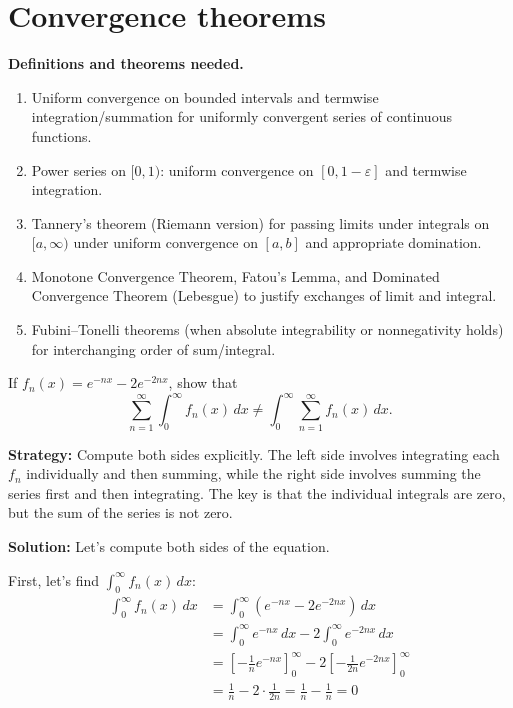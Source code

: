 \section{Convergence theorems}

\noindent\textbf{Definitions and theorems needed.}
\begin{enumerate}[label=(\alph*)]
\item Uniform convergence on bounded intervals and termwise integration/summation for uniformly convergent series of continuous functions.
\item Power series on $[0,1)$: uniform convergence on $[0,1-\varepsilon]$ and termwise integration.
\item Tannery's theorem (Riemann version) for passing limits under integrals on $[a,\infty)$ under uniform convergence on $[a,b]$ and appropriate domination.
\item Monotone Convergence Theorem, Fatou's Lemma, and Dominated Convergence Theorem (Lebesgue) to justify exchanges of limit and integral.
\item Fubini–Tonelli theorems (when absolute integrability or nonnegativity holds) for interchanging order of sum/integral.
\end{enumerate}



\begin{problembox}
\begin{problemstatement}
If $f_n(x) = e^{-nx} - 2e^{-2nx}$, show that 
\[\sum_{n=1}^{\infty} \int_{0}^{\infty} f_n(x) \, dx \neq \int_{0}^{\infty} \sum_{n=1}^{\infty} f_n(x) \, dx.\]
\end{problemstatement}
\end{problembox}

\noindent\textbf{Strategy:} Compute both sides explicitly. The left side involves integrating each $f_n$ individually and then summing, while the right side involves summing the series first and then integrating. The key is that the individual integrals are zero, but the sum of the series is not zero.

\bigskip\noindent\textbf{Solution:}
Let's compute both sides of the equation.

First, let's find $\int_{0}^{\infty} f_n(x) \, dx$:
\begin{align*}
\int_{0}^{\infty} f_n(x) \, dx &= \int_{0}^{\infty} (e^{-nx} - 2e^{-2nx}) \, dx \\
&= \int_{0}^{\infty} e^{-nx} \, dx - 2\int_{0}^{\infty} e^{-2nx} \, dx \\
&= \left[-\frac{1}{n}e^{-nx}\right]_{0}^{\infty} - 2\left[-\frac{1}{2n}e^{-2nx}\right]_{0}^{\infty} \\
&= \frac{1}{n} - 2 \cdot \frac{1}{2n} = \frac{1}{n} - \frac{1}{n} = 0
\end{align*}

